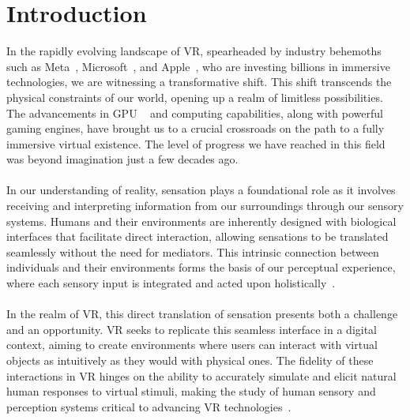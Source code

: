 \chapter{Introduction}
\label{sec:introduction} 
In the rapidly evolving landscape of \ac{VR}, spearheaded by industry behemoths such as Meta~\cite{bezmalinovic2022meta}, Microsoft~\cite{microsoft2022annual}, and Apple~\cite{savitz2023apple}, who are investing billions in immersive technologies, we are witnessing a transformative shift. This shift transcends the physical constraints of our world, opening up a realm of limitless possibilities. The advancements in \ac{GPU} ~\cite{alba2023gpus} and computing capabilities, along with powerful gaming engines, have brought us to a crucial crossroads on the path to a fully immersive virtual existence. The level of progress we have reached in this field was beyond imagination just a few decades ago.\\ \\
In our understanding of reality, sensation plays a foundational role as it involves receiving and interpreting information from our surroundings through our sensory systems. Humans and their environments are inherently designed with biological interfaces that facilitate direct interaction, allowing sensations to be translated seamlessly without the need for mediators. This intrinsic connection between individuals and their environments forms the basis of our perceptual experience, where each sensory input is integrated and acted upon holistically~\cite{goldstein2016sensation}.\\ \\ In the realm of \ac{VR}, this direct translation of sensation presents both a challenge and an opportunity. \ac{VR} seeks to replicate this seamless interface in a digital context, aiming to create environments where users can interact with virtual objects as intuitively as they would with physical ones. The fidelity of these interactions in \ac{VR} hinges on the ability to accurately simulate and elicit natural human responses to virtual stimuli, making the study of human sensory and perception systems critical to advancing \ac{VR} technologies~\cite{steuer1992defining, slater2020immersion, lanier2006homuncular, bowman2007virtual, heeter1992being}. 

